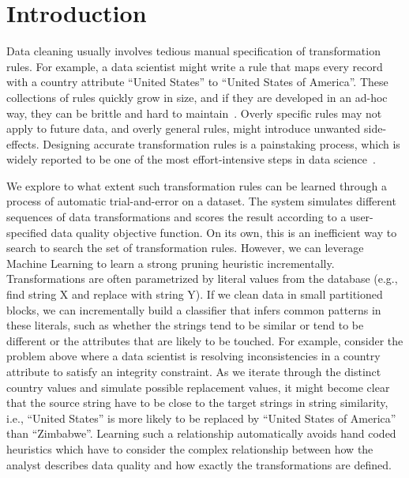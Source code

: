 \section{Introduction}\label{intro}\sloppy
Data cleaning usually involves tedious manual specification of transformation rules.
For example, a data scientist might write a rule that maps every record with a \textsf{country} attribute ``United States'' to ``United States of America''.
These collections of rules quickly grow in size, and if they are developed in an ad-hoc way, they can be brittle and hard to maintain~\cite{krishnan2016hilda}.
Overly specific rules may not apply to future data, and overly general rules, might introduce unwanted side-effects.
Designing accurate transformation rules is a painstaking process, which is widely reported to be one of the most effort-intensive steps in data science~\cite{nytimes}.

We explore to what extent such transformation rules can be learned through a process of automatic trial-and-error on a dataset.
The system simulates different sequences of data transformations and scores the result according to a user-specified data quality objective function.
On its own, this is an inefficient way to search to search the set of transformation rules.
However, we can leverage Machine Learning to learn a strong pruning heuristic incrementally.
Transformations are often parametrized by literal values from the database (e.g., find string X and replace with string Y).
If we clean data in small partitioned blocks, we can incrementally build a classifier that infers common patterns in these literals, such as whether the strings tend to be similar or tend to be different or the attributes that are likely to be touched.
For example, consider the problem above where a data scientist is resolving inconsistencies in a \textsf{country} attribute to satisfy an integrity constraint.
As we iterate through the distinct \textsf{country} values and simulate possible replacement values, it might become clear that the source string have to be close to the target strings in string similarity, i.e., ``United States'' is more likely to be replaced by ``United States of America'' than ``Zimbabwe''.
Learning such a relationship automatically avoids hand coded heuristics which have to consider the complex relationship between how the analyst describes data quality and how exactly the transformations are defined.


